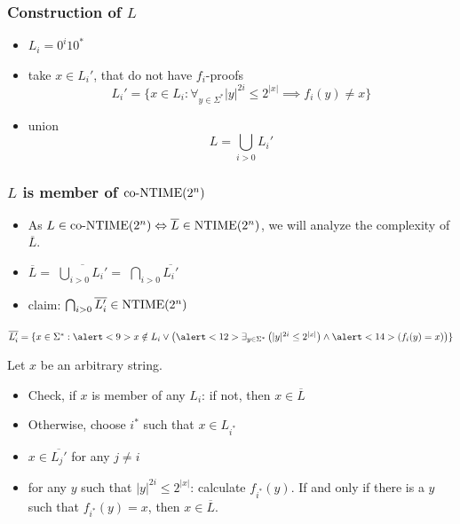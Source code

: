 \begin{frame}
  \frametitle{Construction of \(L\)}

  \begin{itemize}
    \item<1-> \(L_i = 0^i10^*\)
    \item<2-> take \(x \in L_i'\), that do not have \(f_i\)-proofs
              \[L_i' = \{ x \in L_i : \forall_{y \in \Sigma^*} |y|^{2i} \leq 2^{|x|} \implies f_i(y) \neq x \}\]
    \item<3-> union
              \[L = \bigcup_{i>0} L_i' \]
  \end{itemize}
\end{frame}

\begin{frame}
  \frametitle{\(L\) is member of \(\text{co-NTIME}(2^n)\)}

  \begin{itemize}
   \item<2-> As \(L \in \text{co-NTIME}(2^n) \Leftrightarrow \overline{L} \in \text{NTIME}(2^n)\), we will analyze the complexity of \(\overline{L}\).
   \item<3-> \(\overline{L} = \)  \( \overline{ \bigcup_{i>0} L_i' } = \)  \( \bigcap_{i>0} \overline{L_i'}\)
   \item<6-> claim: \( \bigcap_{i>0} \overline{L_i'} \in \text{NTIME}(2^n)\)
  \end{itemize}

  
  \(\overline{L_i'} = \{ x \in \Sigma^* : \alert<9>{ x \notin L_i } \vee \left( \alert<12>{ \exists_{y \in \Sigma^*} \left( |y|^{2i} \leq 2^{|x|} \right) } \wedge \alert<14>{ \left( f_i(y) = x \right) } \right)  \}\)

   Let \(x\) be an arbitrary string.

  \begin{itemize}
   \item<8-> Check, if \(x\) is member of any \(L_i\):  \alert<9>{if not, then \(x \in \overline{L}\) }
   \item<10-> Otherwise, choose \(i^*\) such that \(x \in L_{i^*}\)
   \item<11-> \(x \in \overline{L_j'}\) for any \(j \neq i\)
   \item<12-> \alert<12>{for any \(y\) such that \(|y|^{2i} \leq 2^{|x|}\)}:  calculate \(f_{i^*}(y)\).  \alert<14>{If and only if there is a \(y\) such that \(f_{i^*}(y) = x\), then \(x \in \overline{L}\).}
  \end{itemize}

\end{frame}



